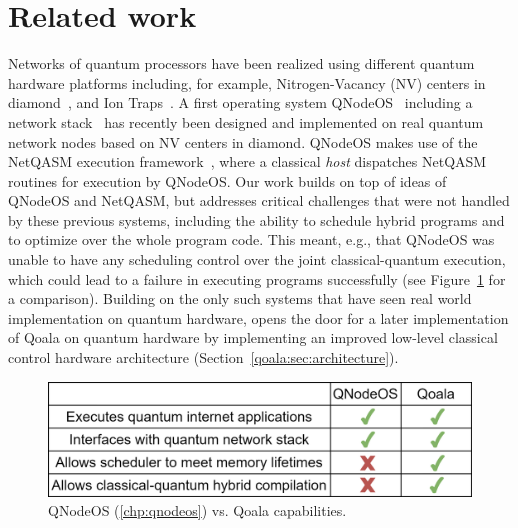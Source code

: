 \section{Related work}
\label{qoala:sec:related_work}

Networks of quantum processors have been realized using different quantum hardware platforms including, for example, Nitrogen-Vacancy (NV) centers in diamond~\cite{pompili2021realization}, and Ion Traps~\cite{krutyanskiy2023entanglement}.
A first operating system QNodeOS~\cite{carlothesis} including a network stack~\cite{pompili2022experimental} has recently been designed and implemented on real quantum network nodes based on NV centers in diamond.
QNodeOS makes use of the NetQASM execution framework~\cite{dahlberg2022netqasm}, where a classical \textit{host} dispatches NetQASM routines for execution by QNodeOS. 
Our work builds on top of ideas of QNodeOS and NetQASM, but addresses critical challenges that were not handled by these previous systems, including the ability to schedule hybrid programs and to optimize over the whole program code.
This meant, e.g., that QNodeOS was unable to have any scheduling control over the joint classical-quantum execution, which could lead to a failure in executing programs successfully (see Figure~\ref{fig:qoala_vs_qnos} for a comparison).
Building on the only such systems that have seen real world implementation on quantum hardware, opens the door for a later implementation of Qoala on quantum hardware by implementing an improved low-level classical control hardware architecture (Section~\ref{qoala:sec:architecture}).

\begin{figure}[ht]
    \centering
    \includegraphics[width=\columnwidth]{figures/qoala/qoala_vs_qnos.png}
    \caption{
        QNodeOS (\ref{chp:qnodeos}) vs. Qoala capabilities.
    }
    \label{fig:qoala_vs_qnos}
\end{figure}

